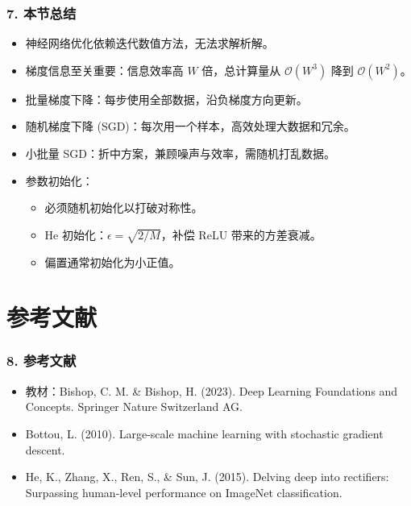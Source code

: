 \documentclass[t,aspectratio=169]{beamer} %
\begin{document}
\begin{frame}
    \frametitle{7. 本节总结}
    \begin{itemize}
        \item 神经网络优化依赖\alert{迭代数值方法}，无法求解析解。
        \item \alert{梯度信息}至关重要：信息效率高 $W$ 倍，总计算量从 $\mathcal{O}(W^3)$ 降到 $\mathcal{O}(W^2)$。
        \item \alert{批量梯度下降}：每步使用全部数据，沿负梯度方向更新。
        \item \alert{随机梯度下降 (SGD)}：每次用一个样本，高效处理大数据和冗余。
        \item \alert{小批量 SGD}：折中方案，兼顾噪声与效率，需随机打乱数据。
        \item \alert{参数初始化}：
        \begin{itemize}
            \item 必须\alert{随机初始化}以打破对称性。
            \item \alert{He 初始化}：$\epsilon = \sqrt{2/M}$，补偿 ReLU 带来的方差衰减。
            \item 偏置通常初始化为\alert{小正值}。
        \end{itemize}
    \end{itemize}
\end{frame}

\section{参考文献}

\begin{frame}
    \frametitle{8. 参考文献}
    \begin{itemize}
        \item 教材：Bishop, C. M. \& Bishop, H. (2023). Deep Learning Foundations and Concepts. Springer Nature Switzerland AG.
        \item Bottou, L. (2010). Large-scale machine learning with stochastic gradient descent.
        \item He, K., Zhang, X., Ren, S., \& Sun, J. (2015). Delving deep into rectifiers: Surpassing human-level performance on ImageNet classification.
    \end{itemize}
\end{frame}
\end{document}
